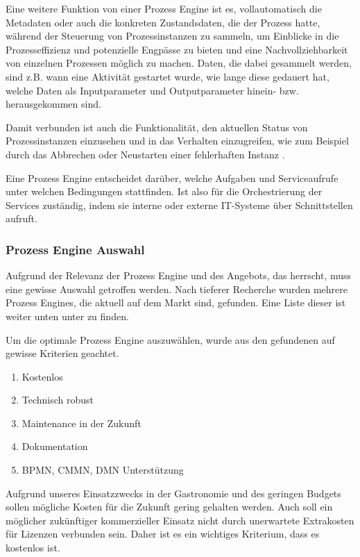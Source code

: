 Eine weitere Funktion von einer Prozess Engine ist es, vollautomatisch die Metadaten oder auch die konkreten Zustandsdaten, die der Prozess hatte, während der Steuerung von Prozessinstanzen zu sammeln, um Einblicke in die Prozesseffizienz und potenzielle Engpässe zu bieten und eine Nachvollziehbarkeit von einzelnen Prozessen möglich zu machen. Daten, die dabei gesammelt werden, sind z.B. wann eine Aktivität gestartet wurde, wie lange diese gedauert hat, welche Daten als Inputparameter und Outputparameter hinein- bzw. herausgekommen sind. \citep[vgl.][S. 7, 226]{freund_praxishandbuch_2017} \citep[vgl.][]{stiehl_prozessgesteuerte_2024} 

Damit verbunden ist auch die Funktionalität, den aktuellen Status von Prozessinstanzen einzusehen und in das Verhalten einzugreifen, wie zum Beispiel durch das Abbrechen oder Neustarten einer fehlerhaften Instanz \citep[vgl.][S.226]{freund_praxishandbuch_2017}.

Eine Prozess Engine entscheidet darüber, welche Aufgaben und Serviceaufrufe unter welchen Bedingungen stattfinden. Ist also für die Orchestrierung der Services zuständig, indem sie interne oder externe IT-Systeme über Schnittstellen aufruft. \citep[vgl.][S. 6]{freund_praxishandbuch_2017}

\subsubsection{Prozess Engine Auswahl}
\label{sec:process_engine_auswahl}

Aufgrund der Relevanz der Prozess Engine und des Angebots, das herrscht, muss eine gewisse Auswahl getroffen werden. Nach tieferer Recherche wurden mehrere Prozess Engines, die aktuell auf dem Markt sind, gefunden. Eine Liste dieser ist weiter unten unter  zu finden. 

Um die optimale Prozess Engine auszuwählen, wurde aus den gefundenen auf gewisse Kriterien geachtet. 
\begin{enumerate}
    \item Kostenlos
    \item Technisch robust
    \item Maintenance in der Zukunft
    \item Dokumentation
    \item \acs{BPMN}, \acs{CMMN}, \acs{DMN} Unterstützung
\end{enumerate}

\label{par:kostenlose_process_engines_auswahl}
Aufgrund unseres Einsatzzwecks in der Gastronomie und des geringen Budgets sollen mögliche Kosten für die Zukunft gering gehalten werden. Auch soll ein möglicher zukünftiger kommerzieller Einsatz nicht durch unerwartete Extrakosten für Lizenzen verbunden sein. Daher ist es ein wichtiges Kriterium, dass es kostenlos ist.

